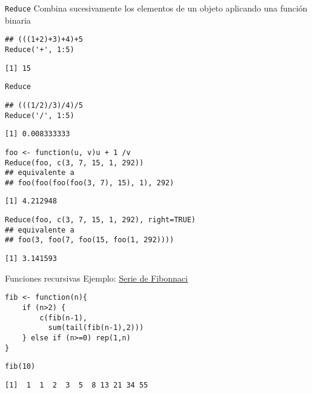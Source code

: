 \documentclass[xcolor={usenames,svgnames,dvipsnames}]{beamer}
\begin{document}
\begin{frame}[label={sec:org369c897},fragile]{\texttt{Reduce}}
 Combina sucesivamente los elementos de un objeto aplicando una función binaria
\lstset{language=r,label= ,caption= ,captionpos=b,numbers=none}
\begin{lstlisting}
## (((1+2)+3)+4)+5
Reduce('+', 1:5)
\end{lstlisting}

\begin{verbatim}
[1] 15
\end{verbatim}
\end{frame}

\begin{frame}[label={sec:orgcf24ff0},fragile]{\texttt{Reduce}}
 \lstset{language=r,label= ,caption= ,captionpos=b,numbers=none}
\begin{lstlisting}
## (((1/2)/3)/4)/5
Reduce('/', 1:5)
\end{lstlisting}

\begin{verbatim}
[1] 0.008333333
\end{verbatim}


\lstset{language=r,label= ,caption= ,captionpos=b,numbers=none}
\begin{lstlisting}
foo <- function(u, v)u + 1 /v
Reduce(foo, c(3, 7, 15, 1, 292))
## equivalente a
## foo(foo(foo(foo(3, 7), 15), 1), 292)
\end{lstlisting}

\begin{verbatim}
[1] 4.212948
\end{verbatim}


\lstset{language=r,label= ,caption= ,captionpos=b,numbers=none}
\begin{lstlisting}
Reduce(foo, c(3, 7, 15, 1, 292), right=TRUE)
## equivalente a
## foo(3, foo(7, foo(15, foo(1, 292))))
\end{lstlisting}

\begin{verbatim}
[1] 3.141593
\end{verbatim}
\end{frame}

\begin{frame}[label={sec:org761b352},fragile]{Funciones recursivas}
 Ejemplo: \href{http://en.wikibooks.org/wiki/R\_Programming/Working\_with\_functions\#Functions\_as\_Objects}{Serie de Fibonnaci}
\lstset{language=r,label= ,caption= ,captionpos=b,numbers=none}
\begin{lstlisting}
fib <- function(n){
    if (n>2) {
        c(fib(n-1),
          sum(tail(fib(n-1),2)))
    } else if (n>=0) rep(1,n)
}
\end{lstlisting}

\lstset{language=r,label= ,caption= ,captionpos=b,numbers=none}
\begin{lstlisting}
fib(10)
\end{lstlisting}

\begin{verbatim}
[1]  1  1  2  3  5  8 13 21 34 55
\end{verbatim}
\end{frame}
\end{document}
